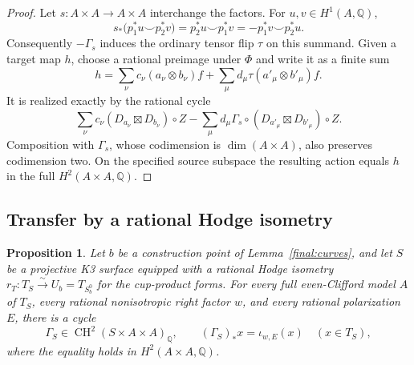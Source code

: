 \documentclass[11pt]{amsart}
\newcommand{\Q}{\mathbb Q}
\DeclareMathOperator{\CH}{CH}
\newtheorem{proposition}[theorem]{Proposition}
\theoremstyle{definition}
\theoremstyle{remark}
\numberwithin{equation}{section}
\begin{document}
\begin{proof}
Let $s:A\times A\to A\times A$ interchange the factors.  For
$u,v\in H^1(A,\Q)$,
\[
 s_*\bigl(p_1^*u\smile p_2^*v\bigr)
 =p_2^*u\smile p_1^*v
 =-p_1^*v\smile p_2^*u.
\]
Consequently $-\Gamma_s$ induces the ordinary tensor flip $\tau$
on this summand.  Given a target map $h$, choose a rational
preimage under $\Phi$ and write it as a finite sum
\[
 h=\sum_\nu c_\nu(a_\nu\otimes b_\nu)f
   +\sum_\mu d_\mu\tau(a'_\mu\otimes b'_\mu)f.
\]
It is realized exactly by the rational cycle
\[
 \sum_\nu c_\nu(D_{a_\nu}\boxtimes D_{b_\nu})\circ Z
 -\sum_\mu d_\mu\Gamma_s\circ
       (D_{a'_\mu}\boxtimes D_{b'_\mu})\circ Z.
\]
Composition with $\Gamma_s$, whose codimension is $\dim(A\times A)$,
also preserves codimension two.  On the specified source subspace
the resulting action equals $h$ in the full $H^2(A\times A,\Q)$.
\end{proof}

\subsection{Transfer by a rational Hodge isometry}

\begin{proposition}\label{final:generic}
Let $b$ be a construction point of Lemma~\ref{final:curves}, and let
$S$ be a projective K3 surface equipped with a rational Hodge isometry
$r_T:T_S\xrightarrow{\sim}U_b=T_{S_b^0}$ for the cup-product forms.
For every full even-Clifford model $A$ of $T_S$, every rational
nonisotropic right factor $w$, and every rational polarization $E$,
there is a cycle
\[
 \Gamma_S\in\CH^2(S\times A\times A)_\Q,
 \qquad (\Gamma_S)_*x=\iota_{w,E}(x)\quad(x\in T_S),
\]
where the equality holds in $H^2(A\times A,\Q)$.
\end{proposition}
\end{document}
